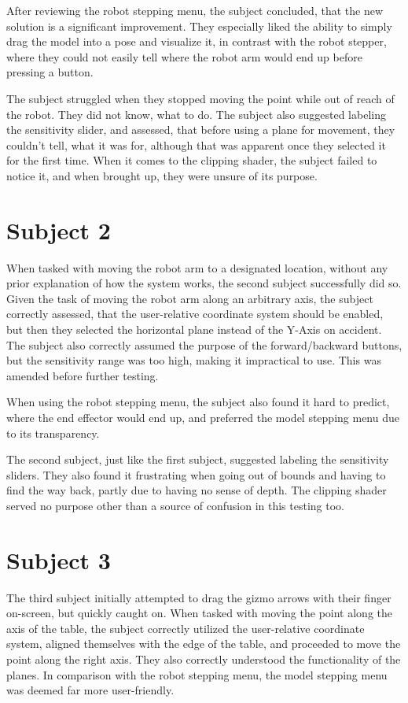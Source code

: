After reviewing the robot stepping menu, the subject concluded, that the new solution is a significant improvement. They especially liked the ability to simply drag the model into a pose and visualize it, in contrast with the robot stepper, where they could not easily tell where the robot arm would end up before pressing a button.

The subject struggled when they stopped moving the point while out of reach of the robot. They did not know, what to do. The subject also suggested labeling the sensitivity slider, and assessed, that before using a plane for movement, they couldn't tell, what it was for, although that was apparent once they selected it for the first time. When it comes to the clipping shader, the subject failed to notice it, and when brought up, they were unsure of its purpose.

\section*{Subject 2}

When tasked with moving the robot arm to a designated location, without any prior explanation of how the system works, the second subject successfully did so. Given the task of moving the robot arm along an arbitrary axis, the subject correctly assessed, that the user-relative coordinate system should be enabled, but then they selected the horizontal plane instead of the Y-Axis on accident. The subject also correctly assumed the purpose of the forward/backward buttons, but the sensitivity range was too high, making it impractical to use. This was amended before further testing.

When using the robot stepping menu, the subject also found it hard to predict, where the end effector would end up, and preferred the model stepping menu due to its transparency. 

The second subject, just like the first subject, suggested labeling the sensitivity sliders. They also found it frustrating when going out of bounds and having to find the way back, partly due to having no sense of depth. The clipping shader served no purpose other than a source of confusion in this testing too.

\section*{Subject 3}

The third subject initially attempted to drag the gizmo arrows with their finger on-screen, but quickly caught on. When tasked with moving the point along the axis of the table, the subject correctly utilized the user-relative coordinate system, aligned themselves with the edge of the table, and proceeded to move the point along the right axis. They also correctly understood the functionality of the planes. In comparison with the robot stepping menu, the model stepping menu was deemed far more user-friendly.

